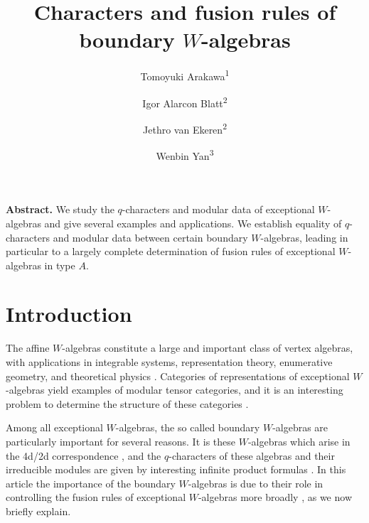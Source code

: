\documentclass[12pt]{amsart}
\title[Characters and fusion rules]{Characters and fusion rules of boundary $W$-algebras}
\author{Tomoyuki Arakawa\textsuperscript{1}}
\author{Igor Alarcon Blatt\textsuperscript{2}}
\author{Jethro van Ekeren\textsuperscript{2}}
\author{Wenbin Yan\textsuperscript{3}}
\theoremstyle{plain}
\theoremstyle{definition}
\numberwithin{equation}{section}
\begin{document}
\maketitle

\vspace*{5mm}

\noindent
\textbf{Abstract.} We study the $q$-characters and modular data of exceptional $W$-algebras and give several examples and applications. We establish equality of $q$-characters and modular data between certain boundary $W$-algebras, leading in particular to a largely complete determination of fusion rules of exceptional $W$-algebras in type $A$.





\section{Introduction}

The affine $W$-algebras constitute a large and important class of vertex algebras, with applications in integrable systems, representation theory, enumerative geometry, and theoretical physics \cite{FF, KRW03, BD-Hitchin, SV2013, AGT}. Categories of representations of exceptional $W$-algebras yield examples of modular tensor categories, and it is an interesting problem to determine the structure of these categories \cite{FKW, AE2023}.

Among all exceptional $W$-algebras, the so called boundary $W$-algebras are particularly important for several reasons. It is these $W$-algebras which arise in the 4d/2d correspondence \cite{BLLPRV}, and the $q$-characters of these algebras and their irreducible modules are given by interesting infinite product formulas \cite{XYY, KW.boundary}. In this article the importance of the boundary $W$-algebras is due to their role in controlling the fusion rules of exceptional $W$-algebras more broadly \cite{AE2023}, as we now briefly explain.
\end{document}

